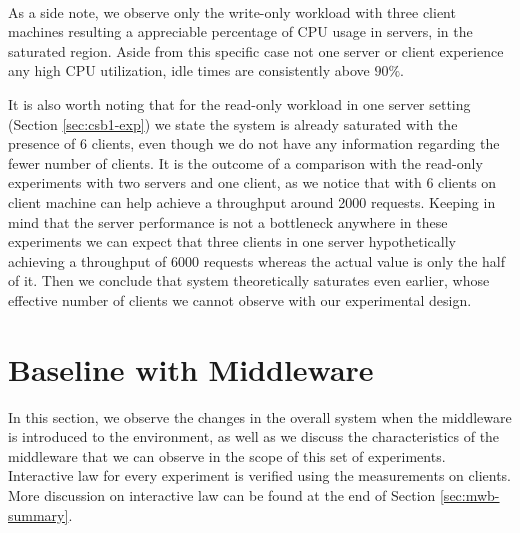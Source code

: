 \documentclass[11pt,a4paper]{article}
\begin{document}
\\
\par As a side note, we observe only the write-only workload with three client machines resulting a appreciable percentage of CPU usage in servers, in the saturated region. Aside from this specific case not one server or client experience any high CPU utilization, idle times are consistently above $90\%$.
\par It is also worth noting that for the read-only workload in one server setting (Section \ref{sec:csb1-exp}) we state the system is already saturated with the presence of 6 clients, even though we do not have any information regarding the fewer number of clients. It is the outcome of a comparison with the read-only experiments with two servers and one client, as we notice that with 6 clients on client machine can help achieve a throughput around 2000 requests. Keeping in mind that the server performance is not a bottleneck anywhere in these experiments we can expect that three clients in one server hypothetically achieving a throughput of 6000 requests whereas the actual value is only the half of it. Then we conclude that system theoretically saturates even earlier, whose effective number of clients we cannot observe with our experimental design.

\section{Baseline with Middleware} \label{sec:mwb}
In this section, we observe the changes in the overall system when the middleware is introduced to the environment, as well as we discuss the characteristics of the middleware that we can observe in the scope of this set of experiments. Interactive law for every experiment is verified using the measurements on clients. More discussion on interactive law can be found at the end of Section \ref{sec:mwb-summary}.
\end{document}
